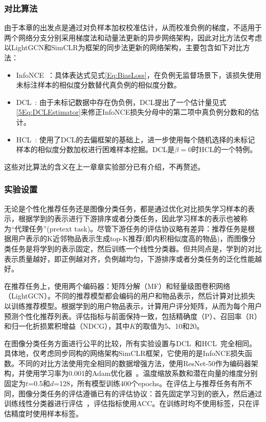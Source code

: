 \subsubsection{对比算法}
由于本章的出发点是通过对负样本加权校准估计，从而校准负例的梯度，不适用于两个网络分支分别采用梯度法和动量法更新的异步网络架构，因此对比方法仅考虑以LightGCN\cite{Xiangnan:2020:SIGIR}和SimCLR\cite{Chen:2020:ICML}为框架的同步法更新的网络架构，主要包含如下对比方法：

\begin{itemize}
	\item InfoNCE~\cite{Oord:2018:arxiv}：具体表达式见式\eqref{Eq:BiasLoss}，在负例无监督场景下，该损失使用未标注样本的相似度分数替代真负例的相似度分数。
	\item DCL~\cite{Chuang:2020:NIPS}: 由于未标记数据中存在伪负例，DCL提出了一个估计量见式\eqref{5Eq:DCLEstimator}来修正InfoNCE损失分母中的第二项中真负例分数和的估计。 
	\item HCL~\cite{Robinson:2021:ICLR}: 使用了DCL的去偏框架的基础上，进一步使用每个随机选择的未标记样本的相似度分数加权进行困难样本挖掘。DCL是$\beta=0$时HCL的一个特例。
\end{itemize}
这些对比算法的含义在上一章章实验部分已有介绍，不再赘述。

\subsubsection{实验设置}
无论是个性化推荐任务还是图像分类任务，都是通过优化对比损失学习样本的表示，根据学到的表示进行下游排序或者分类任务，因此学习样本的表示也被称为“代理任务”(pretext task)。尽管下游任务的评估协议略有差异：推荐任务是根据用户表示的K近邻物品表示生成top-K推荐(即内积相似度高的物品)，而图像分类任务是将学到的表示固定，然后训练一个线性分类器。但共同点是，学到的对比表示质量越好，即正例越对齐，负例越均匀，下游排序或者分类任务的泛化性能越好。

在推荐任务上，使用两个编码器：矩阵分解（MF）\cite{Koren:2009:Computer}和轻量级图卷积网络（LightGCN）\cite{Xiangnan:2020:SIGIR}。不同的推荐模型都会编码的用户和物品表示，然后计算对比损失以训练推荐模型。根据学到的用户物品表示，计算用户评分矩阵，从而为每个用户预测个性化推荐列表。评估指标与前面保持一致，包括精确度（P）、召回率（R）和归一化折损累积增益（NDCG），其中$K$的取值为5、10和20。

在图像分类任务方面进行公平的比较，所有实验设置与DCL~\cite{Chuang:2020:NIPS}和HCL~\cite{Robinson:2021:ICLR}完全相同。具体地，仅考虑同步同构的网络架构SimCLR\cite{Chen:2020:ICML}框架，它使用的是InfoNCE损失函数。不同的对比方法使用完全相同的数据增强方法，使用ResNet-50\cite{He:2016:CVPR}作为编码器架构，并使用学习率为0.001的Adam优化器~\cite{Adam:2015:ICLR}。温度缩放系数和潜在向量的维度分别固定为$t$=0.5和$d$=128，所有模型训练400个epochs。在评估上与推荐任务有所不同，图像分类任务的评估遵循已有的评估协议：首先固定学习到的嵌入，然后通过训练线性分类器进行评估~\cite{Lajanugen:2018:ICLR,Robinson:2021:ICLR}，评估指标使用ACC。在训练时均不使用标签，只在评估精度时使用样本标签。

